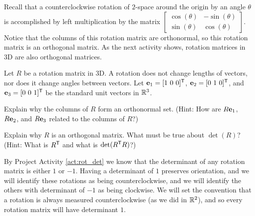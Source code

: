 \ee


Recall that a counterclockwise rotation of $2$-space around the origin by an angle $\theta$ is accomplished by left multiplication by the matrix $\left[ \begin{array}{cr} \cos(\theta)&-\sin(\theta) \\ \sin(\theta)&\cos(\theta) \end{array} \right]$. Notice that the columns of this rotation matrix are orthonormal, so this rotation matrix is an orthogonal matrix. As the next activity shows, rotation matrices in 3D are also orthogonal matrices.

\begin{pactivity} \label{act:rot_det} Let $R$ be a rotation matrix in 3D.  A rotation does not change lengths of vectors, nor does it change angles between vectors. Let $\mathbf{e}_1 = [ 1 \ 0 \ 0]^{\mathsf{T}}$, $\mathbf{e}_2 = [0 \ 1 \ 0]^{\mathsf{T}}$, and $\mathbf{e}_3 = [0 \ 0 \ 1]^{\mathsf{T}}$ be the standard unit vectors in $\mathbb{R}^3$.
\ba
\item Explain why the columns of $R$ form an orthonormal set. (Hint: How are $R \mathbf{e}_1$, $R\mathbf{e}_2$, and $R\mathbf{e}_3$ related to the columns of $R$?) 

\item Explain why $R$ is an orthogonal matrix. What must be true about $\det(R)$? (Hint: What is $R^{\mathsf{T}}$ and what is $\det(R^{\mathsf{T}}R)$?)

\ea

\end{pactivity}

By Project Activity \ref{act:rot_det} we know that the determinant of any rotation matrix is either $1$ or $-1$. Having a determinant of $1$ preserves orientation, and we will identify these rotations as being counterclockwise, and we will identify the others with determinant of $-1$ as being clockwise. We will set the convention that a rotation is always measured counterclockwise (as we did in $\mathbb{R}^2$), and so every rotation matrix will have determinant $1$. 

